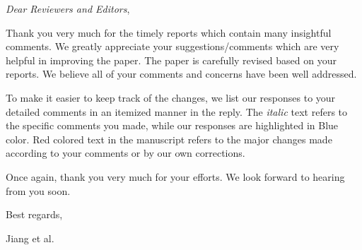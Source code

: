\textit{Dear Reviewers and Editors},

\medskip


Thank you very much for the timely reports which contain many insightful comments. We greatly appreciate your suggestions/comments which are very helpful in improving the paper.
The	paper is carefully revised based on your reports. We believe all of your comments and concerns have been well addressed. 
	
To make it easier to keep track of the changes, we list our responses to your detailed comments in an itemized manner in the reply. The {\em italic}\/ text refers to the specific comments you made, while our responses are highlighted in {\color{blue}Blue} color. {\color{red}Red} colored text in the manuscript refers to the major changes made according to your comments or by our own corrections.
	
Once again, thank you very much for your efforts. We look forward to hearing from you soon.
 
\vspace{4em}

Best regards,

\bigskip
\bigskip
	
Jiang et al.